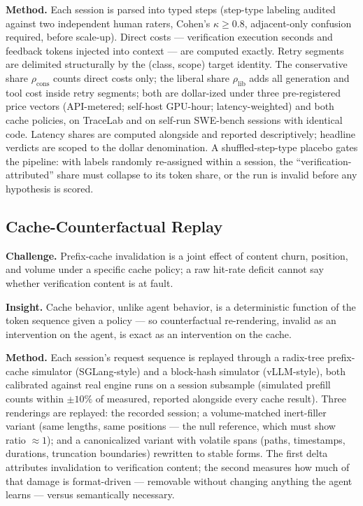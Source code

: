 \documentclass[11pt]{article}
\begin{document}
\textbf{Method.} Each session is parsed into typed steps (step-type labeling audited against two independent human raters, Cohen's $\kappa \geq 0.8$, adjacent-only confusion required, before scale-up). Direct costs --- verification execution seconds and feedback tokens injected into context --- are computed exactly. Retry segments are delimited structurally by the (class, scope) target identity. The conservative share $\rho_{\mathrm{cons}}$ counts direct costs only; the liberal share $\rho_{\mathrm{lib}}$ adds all generation and tool cost inside retry segments; both are dollar-ized under three pre-registered price vectors (API-metered; self-host GPU-hour; latency-weighted) and both cache policies, on TraceLab and on self-run SWE-bench sessions with identical code. Latency shares are computed alongside and reported descriptively; headline verdicts are scoped to the dollar denomination. A shuffled-step-type placebo gates the pipeline: with labels randomly re-assigned within a session, the ``verification-attributed'' share must collapse to its token share, or the run is invalid before any hypothesis is scored.

\subsection{Cache-Counterfactual Replay}

\textbf{Challenge.} Prefix-cache invalidation is a joint effect of content churn, position, and volume under a specific cache policy; a raw hit-rate deficit cannot say whether verification content is at fault.

\textbf{Insight.} Cache behavior, unlike agent behavior, is a deterministic function of the token sequence given a policy --- so counterfactual re-rendering, invalid as an intervention on the agent, is exact as an intervention on the cache.

\textbf{Method.} Each session's request sequence is replayed through a radix-tree prefix-cache simulator (SGLang-style) and a block-hash simulator (vLLM-style), both calibrated against real engine runs on a session subsample (simulated prefill counts within $\pm 10\%$ of measured, reported alongside every cache result). Three renderings are replayed: the recorded session; a volume-matched inert-filler variant (same lengths, same positions --- the null reference, which must show ratio $\approx 1$); and a canonicalized variant with volatile spans (paths, timestamps, durations, truncation boundaries) rewritten to stable forms. The first delta attributes invalidation to verification content; the second measures how much of that damage is format-driven --- removable without changing anything the agent learns --- versus semantically necessary.
\end{document}
